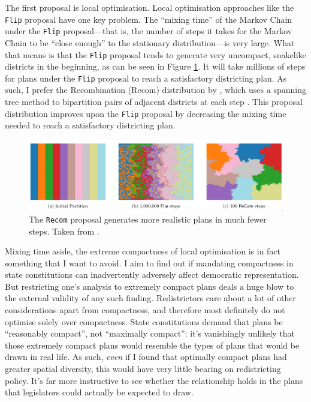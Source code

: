 \documentclass[]{article}
\begin{document}
The first proposal is local optimisation. Local optimisation approaches
like the \texttt{Flip} proposal have one key problem. The ``mixing
time'' of the Markov Chain under the \texttt{Flip} proposal---that is,
the number of steps it takes for the Markov Chain to be ``close enough''
to the stationary distribution---is very large. What that means is that
the \texttt{Flip} proposal tends to generate very uncompact, snakelike
districts in the beginning, as can be seen in Figure
\ref{recom_vs_flip}. It will take millions of steps for plans under the
\texttt{Flip} proposal to reach a satisfactory districting plan. As
such, I prefer the Recombination (Recom) distribution by
\citeauthor{ddj2019recom}, which uses a spanning tree method to
bipartition pairs of adjacent districts at each step
\citep{ddj2019comp}. This proposal distribution improves upon the
\texttt{Flip} proposal by decreasing the mixing time needed to reach a
satisfactory districting plan.

\begin{figure}
\centering
\includegraphics{img/recom_vs_flip.png}
\caption{\label{recom_vs_flip} The \texttt{Recom} proposal generates
more realistic plans in much fewer steps. Taken from
\cite{ddj2019recom}.}
\end{figure}

Mixing time aside, the extreme compactness of local optimisation is in
fact something that I want to avoid. I aim to find out if mandating
compactness in state constitutions can inadvertently adversely affect
democratic representation. But restricting one's analysis to extremely
compact plans deals a huge blow to the external validity of any such
finding. Redistrictors care about a lot of other considerations apart
from compactness, and therefore most definitely do not optimise solely
over compactness. State constitutions demand that plans be ``reasonably
compact'', not ``maximally compact'': it's vanishingly unlikely that
those extremely compact plans would resemble the types of plans that
would be drawn in real life. As such, \emph{even} if I found that
optimally compact plans had greater spatial diversity, this would have
very little bearing on redistricting policy. It's far more instructive
to see whether the relationship holds in the plans that legislators
could actually be expected to draw.
\end{document}
